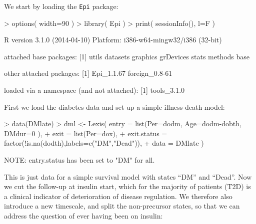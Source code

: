 \documentclass[a4paper,twoside,12pt]{report}
\begin{document}
We start by loading the \texttt{Epi} package:
\begin{Schunk}
\begin{Sinput}
> options( width=90 )
> library( Epi )
> print( sessionInfo(), l=F )
\end{Sinput}
\begin{Soutput}
R version 3.1.0 (2014-04-10)
Platform: i386-w64-mingw32/i386 (32-bit)

attached base packages:
[1] utils     datasets  graphics  grDevices stats     methods   base     

other attached packages:
[1] Epi_1.1.67     foreign_0.8-61

loaded via a namespace (and not attached):
[1] tools_3.1.0
\end{Soutput}
\end{Schunk}
First we load the diabetes data and set up a simple illness-death
model:
\begin{Schunk}
\begin{Sinput}
> data(DMlate)
> dml <- Lexis( entry = list(Per=dodm, Age=dodm-dobth, DMdur=0 ),
+                exit = list(Per=dox),
+         exit.status = factor(!is.na(dodth),labels=c("DM","Dead")),
+                data = DMlate )
\end{Sinput}
\begin{Soutput}
NOTE: entry.status has been set to "DM" for all.
\end{Soutput}
\end{Schunk}
This is just data for a simple survival model with states ``DM'' and
``Dead''. Now we cut the follow-up at insulin start, which for the
majority of patients (T2D) is a clinical indicator of deterioration of
disease regulation. We therefore also introduce a new timescale, and
split the non-precursor states, so that we can address the question of
ever having been on insulin:
\end{document}
